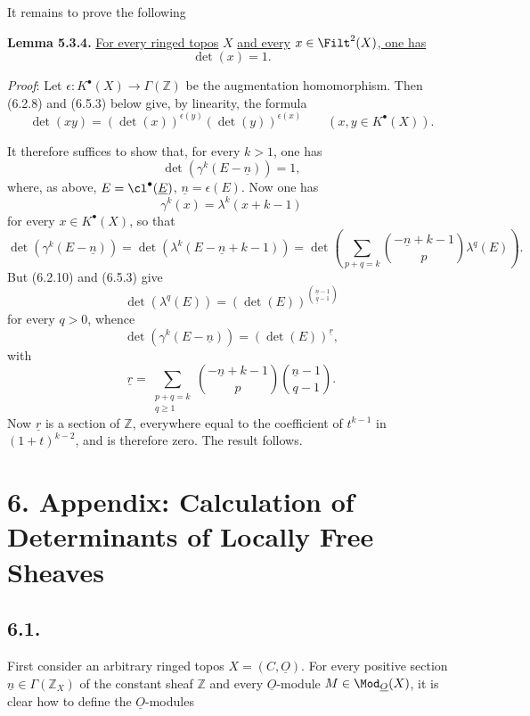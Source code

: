It remains to prove the following

\textbf{Lemma 5.3.4.} \uline{For every ringed topos} \(X\) \uline{and every} \(x\in\Filt^2(X)\)\uline{, one has}
\[
 \det(x)=1.
\]

\emph{Proof}: Let \(\epsilon:K^{\bullet}(X)\to\Gamma(\mathbb Z)\) be the augmentation homomorphism. Then (6.2.8) and (6.5.3) below give, by linearity, the formula
\begin{equation}\tag{5.3.5}
 \det(xy)=(\det(x))^{\epsilon(y)}(\det(y))^{\epsilon(x)}
 \qquad(x,y\in K^{\bullet}(X)).
\end{equation}

%

It therefore suffices to show that, for every \(k>1\), one has
\[
 \det(\gamma^k(E-\underline{n}))=1,
\]
where, as above, \(E=\cl^{\bullet}(\underline E)\), \(\underline{n}=\epsilon(E)\). Now one has
\[
 \gamma^k(x)=\lambda^k(x+k-1)
\]
for every \(x\in K^{\bullet}(X)\), so that
\[
 \det(\gamma^k(E-\underline{n}))
 =
 \det(\lambda^k(E-\underline{n}+k-1))
 =
 \det\left(\sum_{p+q=k}\binom{-\underline{n}+k-1}{p}\lambda^q(E)\right).
\]
But (6.2.10) and (6.5.3) give
\[
 \det(\lambda^q(E))=(\det(E))^{\binom{\underline{n}-1}{\underline{q}-1}}
\]
for every \(q>0\), whence
\[
 \det(\gamma^k(E-\underline{n}))=(\det(E))^{\underline{r}},
\]
with
\[
 \underline{r}=\sum_{\substack{p+q=k\\ q\geq1}}
 \binom{-\underline{n}+k-1}{p}\binom{\underline{n}-1}{q-1}.
\]
Now \(\underline{r}\) is a section of \(\mathbb Z\), everywhere equal to the coefficient of \(t^{k-1}\) in \((1+t)^{k-2}\), and is therefore zero. The result follows.

\section*{6. Appendix: Calculation of Determinants of Locally Free Sheaves}

\subsection*{6.1.}
First consider an arbitrary ringed topos \(X=({C},\underline{O})\). For every positive section \(\underline{n}\in\Gamma(\mathbb Z_X)\) of the constant sheaf \(\mathbb Z\) and every \(\underline{O}\)-module \(M\in\Mod_{\underline{O}}(X)\), it is clear how to define the \(\underline{O}\)-modules

